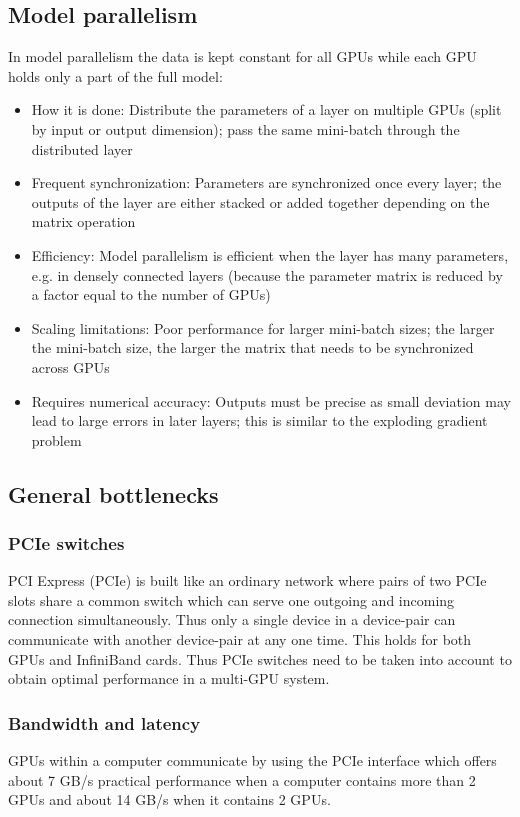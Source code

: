 \documentclass{article} %
\begin{document}
\subsection{Model parallelism}
In model parallelism the data is kept constant for all GPUs while each GPU holds only a part of the full model:
\begin{itemize}
	\item How it is done: Distribute the parameters of a layer on multiple GPUs (split by input or output dimension); pass the same mini-batch through the distributed layer
	\item Frequent synchronization: Parameters are synchronized once every layer; the outputs of the layer are either stacked or added together depending on the matrix operation
	\item Efficiency: Model parallelism is efficient when the layer has many parameters, e.g. in densely connected layers (because the parameter matrix is reduced by a factor equal to the number of GPUs)
	\item Scaling limitations: Poor performance for larger mini-batch sizes; the larger the mini-batch size, the larger the matrix that needs to be synchronized across GPUs
	\item Requires numerical accuracy: Outputs must be precise as small deviation may lead to large errors in later layers; this is similar to the exploding gradient problem \citep{hochreiter2001gradient}
\end{itemize}

\subsection{General bottlenecks}

\subsubsection{PCIe switches}

PCI Express (PCIe) is built like an ordinary network where pairs of two PCIe slots share a common switch which can serve one outgoing and incoming connection simultaneously. Thus only a single device in a device-pair can communicate with another device-pair at any one time. This holds for both GPUs and InfiniBand cards. Thus PCIe switches need to be taken into account to obtain optimal performance in a multi-GPU system.

\subsubsection{Bandwidth and latency}
GPUs within a computer communicate by using the PCIe interface which offers about 7 GB/s practical performance when a computer contains more than 2 GPUs and about 14 GB/s when it contains 2 GPUs. 
\end{document}

